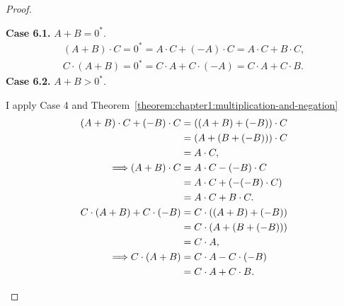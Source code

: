 \begin{proof}
\begin{enumerate}[label={(F\arabic*)}, start=5]
              \textbf{Case 6.1.} $A + B = {0}^{*}$.
              \[
                  \begin{split}
                      (A + B)\cdot C = {0}^{*} = A\cdot C + (-A)\cdot C = A\cdot C + B\cdot C, \\
                      C\cdot (A + B) = {0}^{*} = C\cdot A + C\cdot (-A) = C\cdot A + C\cdot B.
                  \end{split}
              \]
              \textbf{Case 6.2.} $A + B > {0}^{*}$.

              I apply Case 4 and Theorem~\ref{theorem:chapter1:multiplication-and-negation}
              {\allowdisplaybreaks{}
                  \begin{align*}
                      (A + B)\cdot C + (-B)\cdot C   & = ((A + B) + (-B))\cdot C   \\
                                                     & = (A + (B + (-B)))\cdot C   \\
                                                     & = A\cdot C,                 \\
                      \Longrightarrow (A + B)\cdot C & = A\cdot C - (-B)\cdot C    \\
                                                     & = A\cdot C + (-(-B)\cdot C) \\
                                                     & = A\cdot C + B\cdot C.      \\
                      \bigskip
                      C\cdot (A + B) + C\cdot (-B)   & = C\cdot ((A + B) + (-B))   \\
                                                     & = C\cdot (A + (B + (-B)))   \\
                                                     & = C\cdot A,                 \\
                      \Longrightarrow C\cdot (A + B) & = C\cdot A - C\cdot (-B)    \\
                                                     & = C\cdot A + C\cdot B.
                  \end{align*}}


\end{enumerate}
\end{proof}
